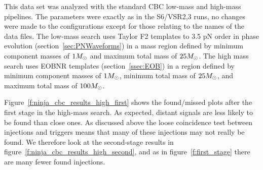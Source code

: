 This data set was analyzed with the standard CBC low-mass and
high-mass pipelines.  The parameters were exactly as in the S6/VSR2,3
runs, no changes were made to the configurations except for those
relating to the names of the data files.  The low-mass search uses
Taylor F2 templates to 3.5 pN order in phase evolution
(section~\ref{sec:PNWaveforms}) in a mass region defined by minimum
component masses of $1 M_\odot$ and maximum total mass of $25 M_\odot$.
The high mass search uses EOBNR templates (section~\ref{ssec:EOB}) in
a region defined by minimum component masses of $1 M_\odot$, minimum
total mass of $25 M_\odot$, and maximum total mass of $100 M_\odot$.


Figure~\ref{f:ninja_cbc_results_high_first} shows the found/missed plots
after the first stage in the high-mass search.  As expected, distant
signals are less likely to be found than close ones.  As discussed
above the loose coincidence test between injections and triggers means
that many of these injections may not really be found.  We therefore
look at the second-stage results in
figure~\ref{f:ninja_cbc_results_high_second}, and as in
figure~\ref{f:first_stage} there are many fewer found injections.  


